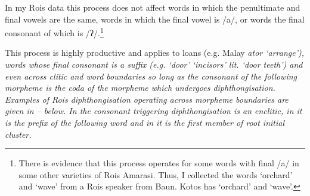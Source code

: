In my Ro{\Q}is data this process does not affect words
in which the penultimate and final vowels are the same,
words in which the final vowel is /a/,
or words the final consonant of which is /ʔ/.\footnote{
		There is evidence that this process operates
		for some words with final /a/ in some other varieties of Ro{\Q}is Amarasi.
		Thus, I collected the words  {\la}  `orchard'
		and  {\la}  `wave' from a Ro{\Q}is speaker
		from Baun. Kotos has  `orchard' and  `wave'.}
		
This process is highly productive
and applies to loans (e.g. Malay \it{ator} {\ra}  `arrange'),
words whose final consonant is a suffix (e.g.  `door' {\ra}
 `incisors' lit. `door teeth')
and even across clitic and word boundaries
so long as the consonant of the following morpheme
is the coda of the morpheme which undergoes diphthongisation.
Examples of Ro{\Q}is diphthongisation operating across morpheme boundaries
are given in -- below.
In  the consonant triggering diphthongisation
is an enclitic, in  it is the prefix of the following
word and in  it is the first member of root initial cluster.
		
\begin{exe}
	\label{ex:RO-170830-1, 4.26}
	\label{ex:RO-170829-1, 19.03}
	\label{ex:RO-170829-1, 17.13}
\end{exe}

